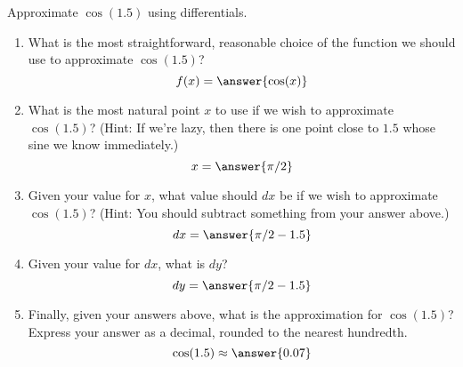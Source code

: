\documentclass{ximera}
\author{Gregory Hartman \and Matthew Carr}
\begin{document}
\begin{exercise}




Approximate $\cos(1.5)$ using differentials.
\begin{enumerate}
\item		What is the most straightforward, reasonable choice of the function we should use to approximate $\cos(1.5)$?\[f(x)=\answer{\cos(x)}\]
\item		What is the most natural point $x$ to use if we wish to approximate $\cos(1.5)$? (Hint: If we're lazy, then there is one point close to $1.5$ whose sine we know immediately.) \[x=\answer{\pi/2}\]
\item		Given your value for $x$, what value should $dx$ be if we wish to approximate $\cos(1.5)$? (Hint: You should subtract something from your answer above.) \[dx=\answer{\pi/2-1.5}\]
\item		Given your value for $dx$, what is $dy$? \[dy=\answer{\pi/2-1.5}\]
\item		Finally, given your answers above, what is the approximation for $\cos(1.5)$? Express your answer as a decimal, rounded to the nearest hundredth. \[\cos(1.5)\approx\answer{0.07}\]
\end{enumerate}


\end{exercise}
\end{document}
